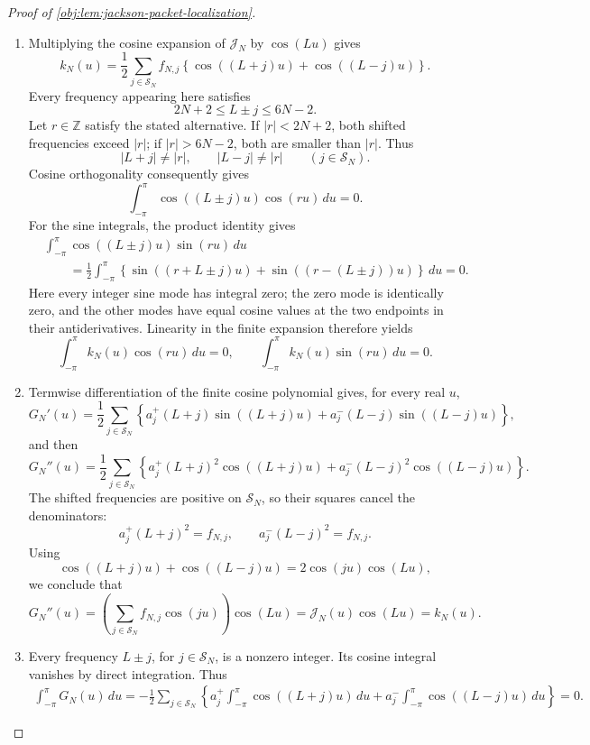 \documentclass[11pt]{article}
\begin{document}
\begin{proof}[Proof of \cref{obj:lem:jackson-packet-localization}]
\begin{enumerate}
\item Multiplying the cosine expansion of \(\mathcal J_N\) by \(\cos(Lu)\) gives
\[
k_N(u)
=\frac12\sum_{j\in\mathcal S_N}f_{N,j}
\left\{\cos((L+j)u)+\cos((L-j)u)\right\}.
\]
Every frequency appearing here satisfies
\[
2N+2\leq L\pm j\leq6N-2.
\]
Let \(r\in\mathbb Z\) satisfy the stated alternative. If \(|r|<2N+2\), both shifted frequencies exceed \(|r|\); if \(|r|>6N-2\), both are smaller than \(|r|\). Thus
\[
|L+j|\neq|r|,\qquad |L-j|\neq|r|
\qquad(j\in\mathcal S_N).
\]
Cosine orthogonality consequently gives
\[
\int_{-\pi}^{\pi}\cos((L\pm j)u)\cos(ru)\,du=0.
\]
For the sine integrals, the product identity gives
\[
\begin{aligned}
&\int_{-\pi}^{\pi}\cos((L\pm j)u)\sin(ru)\,du\\
&\qquad=
\frac12\int_{-\pi}^{\pi}
\left\{\sin((r+L\pm j)u)+\sin((r-(L\pm j))u)\right\}\,du
=0.
\end{aligned}
\]
Here every integer sine mode has integral zero; the zero mode is identically zero, and the other modes have equal cosine values at the two endpoints in their antiderivatives. Linearity in the finite expansion therefore yields
\[
\int_{-\pi}^{\pi}k_N(u)\cos(ru)\,du=0,
\qquad
\int_{-\pi}^{\pi}k_N(u)\sin(ru)\,du=0.
\]

\item Termwise differentiation of the finite cosine polynomial gives, for every real \(u\),
\[
G_N'(u)
=\frac12\sum_{j\in\mathcal S_N}
\left\{
a_j^+(L+j)\sin((L+j)u)
+a_j^-(L-j)\sin((L-j)u)
\right\},
\]
and then
\[
G_N''(u)
=\frac12\sum_{j\in\mathcal S_N}
\left\{
a_j^+(L+j)^2\cos((L+j)u)
+a_j^-(L-j)^2\cos((L-j)u)
\right\}.
\]
The shifted frequencies are positive on \(\mathcal S_N\), so their squares cancel the denominators:
\[
a_j^+(L+j)^2=f_{N,j},
\qquad
a_j^-(L-j)^2=f_{N,j}.
\]
Using
\[
\cos((L+j)u)+\cos((L-j)u)
=2\cos(ju)\cos(Lu),
\]
we conclude that
\[
G_N''(u)
=
\left(\sum_{j\in\mathcal S_N}f_{N,j}\cos(ju)\right)\cos(Lu)
=\mathcal J_N(u)\cos(Lu)
=k_N(u).
\]

\item Every frequency \(L\pm j\), for \(j\in\mathcal S_N\), is a nonzero integer. Its cosine integral vanishes by direct integration. Thus
\[
\begin{aligned}
\int_{-\pi}^{\pi}G_N(u)\,du
=-\frac12\sum_{j\in\mathcal S_N}
\left\{
a_j^+\int_{-\pi}^{\pi}\cos((L+j)u)\,du
+a_j^-\int_{-\pi}^{\pi}\cos((L-j)u)\,du
\right\}
=0.
\end{aligned}
\]


\end{enumerate}
\end{proof}
\end{document}
